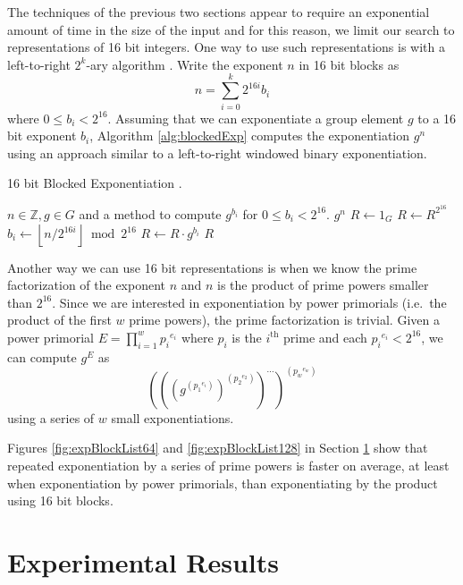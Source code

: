 \documentclass{ucalgthes1}
\theoremstyle{definition}
\newcommand{\ZZ}{\mathbb{Z}}
\newcommand{\floor}[1]{\left\lfloor #1 \right\rfloor}
\newcommand{\ceil}[1]{\left\lceil #1 \right\rceil}
\begin{document}
The techniques of the previous two sections appear to require an exponential amount of time in the size of the input and for this reason, we limit our search to representations of 16 bit integers.  One way to use such representations is with a left-to-right $2^k$-ary algorithm \mbox{\cite[\S 9.1.2]{Cohen2006}}.  Write the exponent $n$ in 16 bit blocks as
\[
	n = \sum_{i=0}^k 2^{16i} b_i
\]
where $0 \le b_i < 2^{16}$.  Assuming that we can exponentiate a group element $g$ to a 16 bit exponent $b_i$, Algorithm \ref{alg:blockedExp} computes the exponentiation $g^n$ using an approach similar to a left-to-right windowed binary exponentiation.

\begin{algorithm}[htb]
\caption{16 bit Blocked Exponentiation \cite[Algorithm 9.7]{Cohen2006}.}
\label{alg:blockedExp}
\begin{algorithmic}[1]
\Require $n \in \ZZ, g \in G$ and a method to compute $g^{b_i}$ for $0 \le b_i < 2^{16}$.
\Ensure $g^n$
\State $R \gets 1_G$
\For {$i$ from $\ceil{\log_{2^{16}} n}$ downto 0}
	\State $R \gets R^{2^{16}}$ 
	\State $b_i \gets \floor{n / 2^{16i}} \bmod {2^{16}}$
	\State $R \gets R \cdot g^{b_i}$ 
\EndFor
\State \Return $R$
\end{algorithmic}
\end{algorithm}

Another way we can use 16 bit representations is when we know the prime factorization of the exponent $n$ and $n$ is the product of prime powers smaller than $2^{16}$.  Since we are interested in exponentiation by power primorials (i.e.\ the product of the first $w$ prime powers), the prime factorization is trivial.  Given a power primorial $E = \prod_{i=1}^w {p_i}^{e_i}$ where $p_i$ is the $i^{\textrm{th}}$ prime and each ${p_i}^{e_i} < 2^{16}$, we can compute $g^E$ as
\[
\left(\left(\left(g^{\left({p_1}^{e_i}\right)}\right)
    ^{\left({p_2}^{e_2}\right)}\right)^{\cdots}\right)^{\left({p_w}^{e_w}\right)}
\]
using a series of $w$ small exponentiations.

Figures \ref{fig:expBlockList64} and \ref{fig:expBlockList128} in Section \ref{sec:expResults} show that repeated exponentiation by a series of prime powers is faster on average, at least when exponentiation by power primorials, than exponentiating by the product using 16 bit blocks.

\section{Experimental Results}
\label{sec:expResults}
\end{document}

